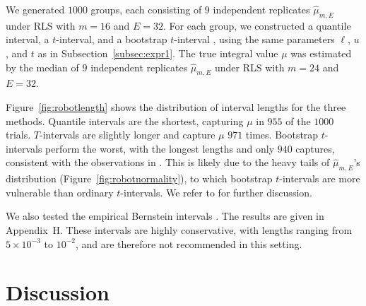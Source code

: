 \documentclass{article}
\theoremstyle{definition}
\newcommand{\appH}{H}
\begin{document}
We generated $1000$ groups, each consisting of $9$ independent replicates $\hat{\mu}_{m,E}$ under RLS with $m=16$ and $E=32$. For each group, we constructed a quantile interval, a $t$-interval, and a bootstrap $t$-interval \cite{efron1981nonparametric}, using the same parameters $\ell$, $u$, and $t$ as in Subsection~\ref{subsec:expr1}. The true integral value $\mu$ was estimated by the median of $9$ independent replicates $\hat{\mu}_{m,E}$ under RLS with $m=24$ and $E=32$.

Figure~\ref{fig:robotlength} shows the distribution of interval lengths for the three methods. Quantile intervals are the shortest, capturing $\mu$ in $955$ of the $1000$ trials. $T$-intervals are slightly longer and capture $\mu$ $971$ times. Bootstrap $t$-intervals perform the worst, with the longest lengths and only $940$ captures, consistent with the observations in \cite{ci4rqmc}. This is likely due to the heavy tails of $\hat{\mu}_{m,E}$'s distribution (Figure~\ref{fig:robotnormality}), to which bootstrap $t$-intervals are more vulnerable than ordinary $t$-intervals. We refer to \cite{owen2025errorestimationquasimontecarlo,owen2025better} for further discussion.

We also tested the empirical Bernstein intervals \cite{jain2025empirical}. The results are given in Appendix~\appH. These intervals are highly conservative, with lengths ranging from $5\times 10^{-3}$ to $10^{-2}$, and are therefore not recommended in this setting.







\section{Discussion}\label{sec:discussion}
\end{document}
